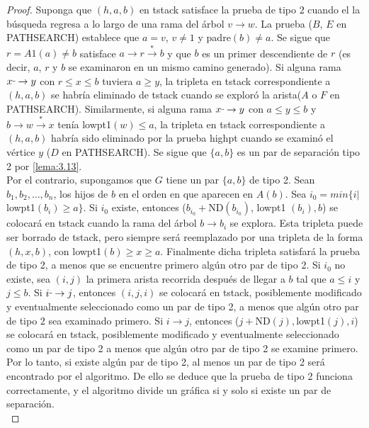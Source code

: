 \begin{proof}
Suponga que $\left(h, a, b\right)$ en tstack satisface la prueba de tipo 2 cuando el la búsqueda regresa a lo largo de una rama del árbol $v \rightarrow w$. La prueba ($B$, $E$ en PATHSEARCH) establece que $a = v$, $v \neq 1$ y padre$\left(b\right) \neq a$. Se sigue que $r = A1 \left(a\right) \neq b$ satisface $a \rightarrow r \overset{\ast}{\rightarrow} b$ y que $b$ es un primer descendiente de $r$ (es decir, $a$, $r$ y $b$ se examinaron en un mismo camino generado). Si alguna rama $x \rule[1mm]{.1cm}{0.4pt}  \rightarrow y$ con $r \leq x \le b$ tuviera $a \ge y$, la tripleta en tstack correspondiente a $\left(h, a, b\right)$ se habría eliminado de tstack cuando se exploró la arista($A$ o $F$ en PATHSEARCH). Similarmente, si alguna rama $x \rule[1mm]{.1cm}{0.4pt}  \rightarrow y$ con $a \le y \le b$ y $b \rightarrow w \overset{\ast}{\rightarrow} x$ tenía lowpt1$\left(w\right) \le a$, la tripleta en tstack correspondiente a $\left(h, a, b\right)$ habría sido eliminado por la prueba highpt cuando se examinó el vértice $y$ ($D$ en PATHSEARCH). Se sigue que $\{a, b\}$ es un par de separación tipo 2 por \ref{lema:3.13}.\\
Por el contrario, supongamos que $G$ tiene un par $\{a, b\}$ de tipo 2. Sean $b_{1}, b_{2}, \ldots, b_{n}$, los hijos de $b$ en el orden en que aparecen en $A\left(b\right)$. Sea $i_{0} = min\{i |$ lowpt1$\left(b_{i}\right) \geq a\}$. Si $i_{0}$ existe, entonces ($b_{i_{0}} + $ND$\left(b_{i_{0}}\right)$, lowpt1 $\left(b_{i}\right), b$) se colocará en tstack cuando la rama del árbol $b \rightarrow b_{i}$ se explora. Esta tripleta puede ser borrado de tstack, pero siempre será reemplazado por una tripleta de la forma $\left(h, x, b\right)$, con lowpt1$\left(b\right) \geq x \geq a$. Finalmente dicha tripleta satisfará la prueba de tipo 2, a menos que se encuentre primero algún otro par de tipo 2. Si $i_{0}$ no existe, sea $\left(i, j\right)$ la primera arista recorrida después de llegar a $b$ tal que $a \leq i$ y $j \leq b$. Si $i \rule[1mm]{.1cm}{0.4pt}  \rightarrow j$, entonces $\left(i, j, i\right)$ se colocará en tstack, posiblemente modificado y eventualmente seleccionado como un par de tipo 2, a menos que algún otro par de tipo 2 sea examinado primero. Si $i \rightarrow j$, entonces ($j + $ND$\left(j\right), $lowpt1$\left(j\right), i$) se colocará en tstack, posiblemente modificado y eventualmente seleccionado como un par de tipo 2 a menos que algún otro par de tipo 2 se examine primero. Por lo tanto, si existe algún par de tipo 2, al menos un par de tipo 2 será encontrado por el algoritmo. De ello se deduce que la prueba de tipo 2 funciona correctamente, y el algoritmo divide un gráfica si y solo si existe un par de separación.\\

\end{proof}
